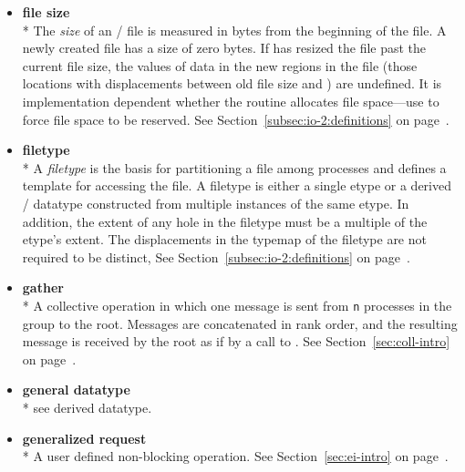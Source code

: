 \begin{itemize}
\label{glossary:file_size}
\item \textbf{ file size} \\*
The {\it size} of an \MPI/ file is measured in bytes from the 
beginning of the file.  A newly created file has a size of zero 
bytes.  
If  has resized the file past the
current file size, the values of data in the new regions in the file (those
locations with displacements between old file size and )
are undefined.
It is implementation dependent whether the  routine
allocates file space---use 
to force file space to be reserved.
See Section~\ref{subsec:io-2:definitions} on page~\pageref{subsec:io-2:definitions}.

\label{glossary:filetype}
\item \textbf{ filetype} \\* 
A {\it filetype} is the basis for partitioning a file among processes
and defines a template for accessing the file.
A filetype is either a single etype or a derived \MPI/ datatype
constructed from multiple instances of the same etype.
In addition,
the extent of any hole in the filetype
must be a multiple of the etype's extent.
The displacements in the typemap of the filetype are not required to be distinct,
See Section~\ref{subsec:io-2:definitions} on page~\pageref{subsec:io-2:definitions}.

\label{glossary:gather}
\item \textbf{ gather} \\*
A collective operation in which one message is sent from {\tt n} 
processes in the group to the root. Messages are concatenated in rank order, and the
resulting message is received by the root as if by a call to
.
See Section~\ref{sec:coll-intro} on page~\pageref{sec:coll-intro}.

\label{glossary:general_datatype}
\item \textbf{ general datatype} \\*
see derived datatype.

\label{glossary:generalized_request}
\item \textbf{ generalized request} \\*
A user defined non-blocking operation.
See Section~\ref{sec:ei-intro} on page~\pageref{sec:ei-intro}.


\end{itemize}
